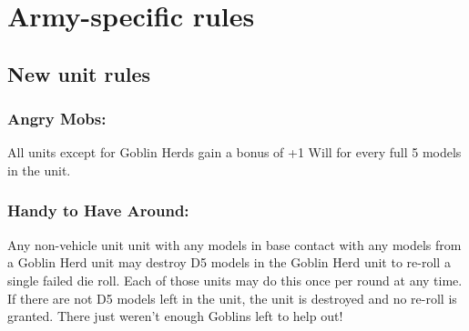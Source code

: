 \newcommand{\Flamethrower}{Flamethrower: R8 A3 Autohit D2 [Assault, Slow, Spray, Terrifying 0]}
\newcommand{\TechnoBlaster}[1][7+]{Techno Blaster: R20 A1 {#1} D5 [Deadly D10, Slow, Unstable]}

\newcommand{\FieldGun}[1][6+]{Field Gun: Choose a type each time it fires:
\begin{itemize}
    \item Frag shell: R30 A4 6+ D1 [Area Effect, Heavy, Slow]
    \item Tank shell: R30 A1, 6+ D6 [Deadly D10, Heavy, Slow]
\end{itemize}
}
\newcommand{\GiantFlamethrower}{Giant Flamethrower: R10 A10 Autohit D2 [Assault, Slow, Spray, Terrifying 2]}
\newcommand{\HeavyFlamethrower}{Heavy Flamethrower: R8 A6 Autohit D2 [Assault, Slow, Spray, Terrifying 2]}
\newcommand{\Howitzer}[1][6+]{Howitzer: R30 A6 {#1} D1 [Area Effect, Heavy, Slow, Suppressive 0]}
\newcommand{\LotsOfGuns}[1][8+]{Lots of Guns: R20 A3 {#1} D2 [Assault, Suppressive 0]}
\newcommand{\MegaCannon}[1][6+]{Mega Cannon: R30 A8 {#1} D3 [Area Effect, Deadly 3, Heavy, Slow]}
\newcommand{\RocketLauncher}[1][7+]{Rocket Launcher: R20 A1 {#1} D3 [Deadly D10-2 (min 1), slow]}
\newcommand{\RocketLaunchers}[1][7+]{Rocket Launchers: R20 A2 {#1} D3 [Deadly D10-2 (min 1), slow]}
\newcommand{\TechnoCannon}[1][6+]{Techno Cannon: R30 A3 {#1} D5 [Area Effect, Critical 10, Deadly D10+2, Heavy, Slow, Unstable 2]}
\newcommand{\TonsOfGuns}[1][8+]{Tons of Guns: R20 A6 {#1} D2 [Assault, Suppressive 0]}






\section*{Army-specific rules}

\subsection*{New unit rules}

\subsubsection*{Angry Mobs:} All units except for Goblin Herds gain a bonus of +1 Will for every full 5 models in the unit.

\subsubsection*{Handy to Have Around:} Any non-vehicle unit unit with any models in base contact with any models from a Goblin Herd unit may destroy D5 models in the Goblin Herd unit to re-roll a single failed die roll. Each of those units may do this once per round at any time. If there are not D5 models left in the unit, the unit is destroyed and no re-roll is granted. There just weren't enough Goblins left to help out!


